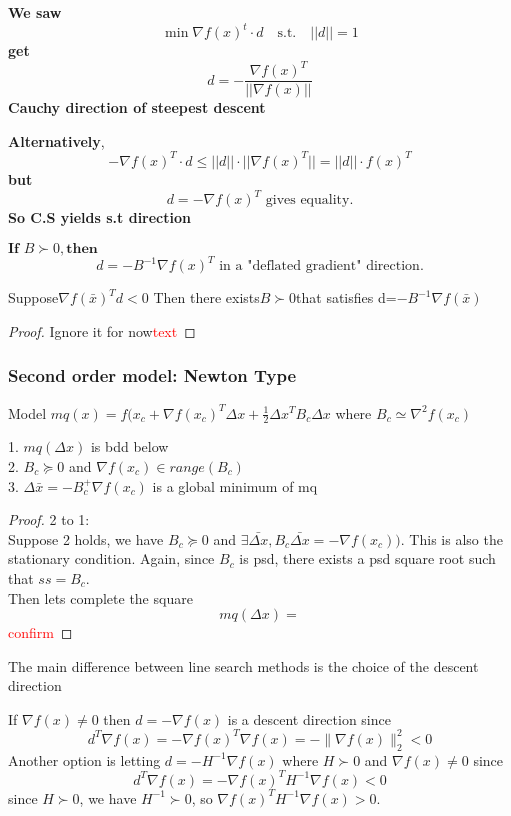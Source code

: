 \begin{problem}
  \textbf{We saw}
  \[
  \min \nabla f(x)^t \cdot d \quad \text{s.t.} \quad ||d|| = 1
  \]
  \textbf{get} 
  \[
  d = -\frac{\nabla f(x)^T}{||\nabla f(x)||}
  \]
  \textbf{Cauchy direction of steepest descent}
  
  \textbf{Alternatively},
  \[
  -\nabla f(x)^T \cdot d \leq ||d|| \cdot ||\nabla f(x)^T|| = ||d|| \cdot f(x)^T
  \]
  \textbf{but} 
  \[
  d = -\nabla f(x)^T \text{ gives equality.}
  \]
  \textbf{So C.S yields s.t direction}
  
  $\textbf{If } B \succ 0, \textbf{then} $
  \[
  d = -B^{-1} \nabla f(x)^T \text{ in a "deflated gradient" direction.}
  \]
  
  
\end{problem}
\begin{proposition}[Existence of B]
  Suppose$\nabla f(\bar{x})^T d <0$ Then there exists$B\succ0$that satisfies d=$-B^{-1}\nabla f(\bar{x})$
\end{proposition}
\begin{proof}
  Ignore it for now\textcolor{red}{text}
\end{proof}

\subsubsection[short]{Second order model: Newton Type}
Model $mq(x)=f(x_c+\nabla f(x_c)^T\Delta x+\frac{1}{2}\Delta x^TB_c \Delta x$ 
where $B_c\simeq \nabla^2f(x_c)$

\begin{lemma}[TFAE]
  1. $mq(\Delta x)$ is bdd below
  \\2. $B_c \succeq 0$ and $\nabla f(x_c)\in range(B_c)$
  \\3. $\Delta \bar{x}=-B_c^+\nabla f(x_c)$ is a global minimum of mq
\end{lemma}
\begin{proof}
  2 to 1:
  \\ Suppose 2 holds, we have $B_c \succeq 0$ and $\exists \bar{\Delta x},B_c\bar{\Delta x}=-\nabla f(x_c))$.
  This is also the stationary condition. Again, since $B_c$ is psd, there exists a psd square root such that $ss=B_c$.
  \\ Then lets complete the square $$mq(\Delta x)=$$ \textcolor{red}{confirm}

\end{proof}
The main difference between line search methods is the choice of the descent direction
\begin{problem}[Example]
  If $\nabla f(x) \neq 0$ then $d = - \nabla f(x)$ is a descent direction since
  $$d^T \nabla f(x) = -\nabla f(x)^T \nabla f(x) = - \|\nabla f(x) \|^2_2 < 0$$
  Another option is letting $d = -H^{-1} \nabla f(x)$ where $H \succ 0$ and $\nabla f(x) \neq 0$ since
  $$d^T \nabla f(x) = - \nabla f(x)^T H^{-1} \nabla f(x) < 0$$
  since $H \succ 0$, we have $H^{-1} \succ 0$, so $\nabla f(x)^T H^{-1} \nabla f(x) > 0$.
\end{problem}

